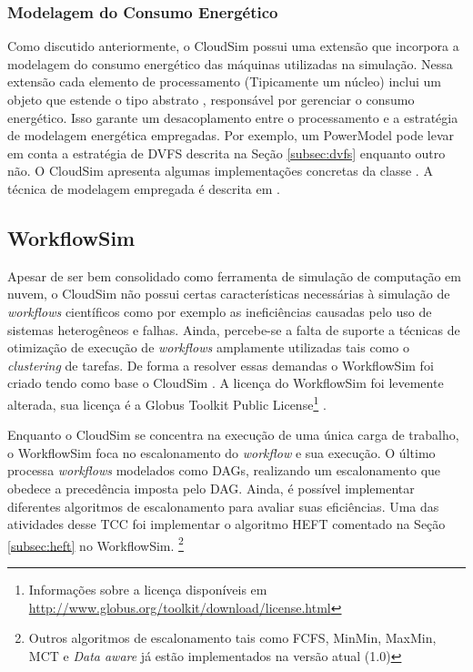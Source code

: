 \subsubsection{Modelagem do Consumo Energético}
Como discutido anteriormente, o CloudSim possui uma extensão que incorpora 
a modelagem do consumo energético das máquinas utilizadas na simulação. Nessa 
extensão cada elemento de processamento (Tipicamente um núcleo) inclui um
objeto que estende o tipo abstrato , responsável por gerenciar o
consumo energético. Isso garante um desacoplamento entre o processamento e 
a estratégia de modelagem energética empregadas. Por exemplo,
um PowerModel pode levar em conta a estratégia de DVFS descrita na Seção 
\ref{subsec:dvfs} enquanto outro não. O CloudSim apresenta algumas implementações
concretas da classe . A técnica de modelagem empregada é descrita
em \cite{beloglazov:cloudsim_power}.


\subsection{WorkflowSim}
\label{subsec:workflowsim}
Apesar de ser bem consolidado como ferramenta de simulação de computação em nuvem,
o CloudSim não possui certas características necessárias à simulação de 
\emph{workflows} científicos como por exemplo as ineficiências causadas pelo
uso de sistemas heterogêneos e falhas. Ainda, percebe-se a falta de suporte a 
técnicas de otimização de execução de \emph{workflows} amplamente utilizadas
tais como o \emph{clustering} de tarefas. De forma a resolver essas demandas
o WorkflowSim foi criado tendo como base o CloudSim \cite{chen:workflowsim}.
A licença do WorkflowSim foi levemente alterada, sua licença é a Globus Toolkit
Public License\footnote{Informações sobre a licença disponíveis em 
\url{http://www.globus.org/toolkit/download/license.html}}
\cite{workflowsim:license}.

Enquanto o CloudSim se concentra na execução de uma única carga de trabalho,
o WorkflowSim foca no escalonamento do \emph{workflow} e sua execução. O último
processa \emph{workflows} modelados como DAGs, realizando um escalonamento que 
obedece a precedência imposta pelo DAG. Ainda, é possível implementar diferentes
algoritmos de escalonamento para avaliar suas eficiências. Uma das atividades desse
TCC foi implementar o algoritmo HEFT comentado na Seção \ref{subsec:heft} no 
WorkflowSim. \footnote{Outros algoritmos de escalonamento tais como FCFS, 
MinMin, MaxMin, MCT e \emph{Data aware} já estão implementados na versão atual
(1.0)}

